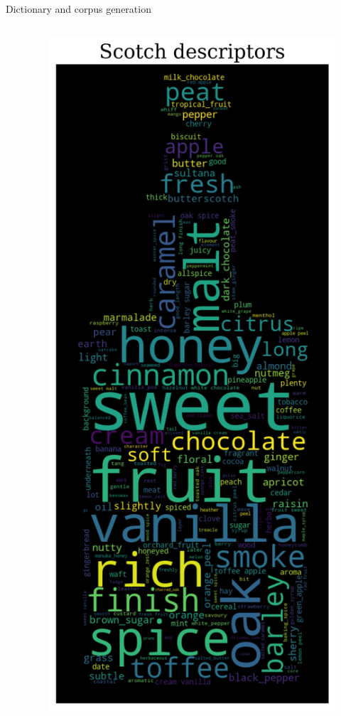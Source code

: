 \documentclass{beamer}
\begin{document}
\begin{frame}{Dictionary and corpus generation}
\begin{columns}
\begin{column}{0.5\textwidth}
\begin{itemize}
\end{itemize}
\end{column}
\begin{column}{0.5\textwidth}
	\begin{figure}[H]
		\begin{center}
			\includegraphics[scale = 0.32]{wc_token_unified}
		\end{center}
	\end{figure}
\end{column}
\end{columns}
\end{frame}
\end{document}
